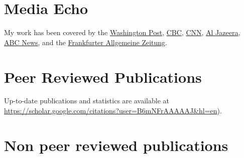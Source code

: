 \documentclass[11pt,a4paper,sans]{moderncv}
\begin{document}
\section{Media Echo}

My work has been covered by the \href{https://www.washingtonpost.com/climate-environment/2021/10/11/85-percent-population-climate-impacts/}{Washington Post}, \href{https://www.cbc.ca/news/science/global-south-climate-science-1.6212471}{CBC}, \href{https://edition.cnn.com/2021/10/11/world/climate-change-attribution-gap/index.html}{CNN}, \href{https://www.aljazeera.com/news/2021/10/11/climate-change-may-already-affect-85-percent-of-humanity-report}{Al Jazeera}, \href{https://abcnews.go.com/US/human-induced-climate-change-affect-85-global-population/story?id=80523851}{ABC News}, and the \href{https://www.faz.net/aktuell/wissen/erde-klima/kuenstliche-intelligenz-zeigt-weltweite-auswirkungen-des-klimawandels-17613824.html}{Frankfurter Allgemeine Zeitung}.





\section{Peer Reviewed Publications}

 Up-to-date publications and statistics are available at  \url{https://scholar.google.com/citations?user=B6mNFrAAAAAJ&hl=en}).

\medskip
\renewcommand{\bibsection}{}



%



\section{Non peer reviewed publications}
\end{document}
